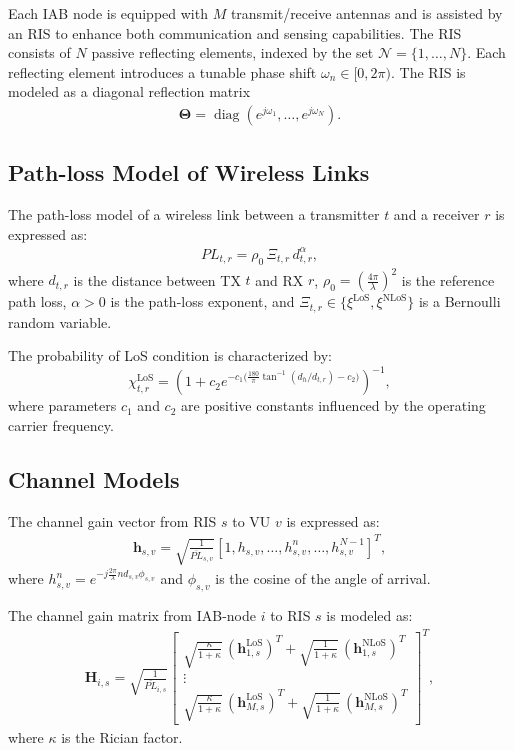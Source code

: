 \documentclass[journal]{IEEEtran}
\begin{document}
Each IAB node is equipped with $M$ transmit/receive antennas and is assisted by an RIS to enhance both communication and sensing capabilities. The RIS consists of $N$ passive reflecting elements, indexed by the set $\mathcal{N} = \{1, \ldots, N\}$. Each reflecting element introduces a tunable phase shift $\omega_n \in [0, 2\pi)$. The RIS is modeled as a diagonal reflection matrix
\begin{align}
\boldsymbol{\Theta} = \operatorname{diag}(e^{j\omega_1}, \ldots, e^{j\omega_{N}}).
\end{align}

\subsection{Path-loss Model of Wireless Links}

The path-loss model of a wireless link between a transmitter $t$ and a receiver $r$ is expressed as:
\begin{align}\label{Eqn:RandPL}
PL_{t,r} = \rho_0\, \Xi_{t,r}\, d_{t,r}^{\alpha},
\end{align} 
where $d_{t,r}$ is the distance between TX $t$ and RX $r$, $\rho_0 = (\frac{4\pi}{\lambda})^2$ is the reference path loss, $\alpha>0$ is the path-loss exponent, and $\Xi_{t,r}\in\{\xi^{\text{LoS}},  \xi^{\text{NLoS}}\}$ is a Bernoulli random variable.

The probability of LoS condition is characterized by:
\begin{equation}
    \chi^{\text{LoS}}_{t,r} = \left(1 + c_2 e^{-c_1\big(\frac{180}{\pi} \tan^{-1}(d_h/d_{t,r}) - c_2 \big)}\right)^{-1},
\end{equation} 
where parameters $c_1$ and $c_2$ are positive constants influenced by the operating carrier frequency.

\subsection{Channel Models}

The channel gain vector from RIS $s$ to VU $v$ is expressed as:
\begin{align}\label{Eqn:ChaModel_sv}
\mathbf{h}_{s,v} = \sqrt{\frac{1}{\overline{PL}_{s,v}}} \left[1, h_{s,v}, \ldots, h^n_{s,v}, \ldots, h^{N-1}_{s,v} \right]^T,
\end{align}
where $h^n_{s,v} = e^{-j \frac{2\pi}{\lambda}n d_{s,v} \phi_{s,v}}$ and $\phi_{s,v}$ is the cosine of the angle of arrival.

The channel gain matrix from IAB-node $i$ to RIS $s$ is modeled as:
\begin{align}
\mathbf{H}_{i,s} = \sqrt{\frac{1}{\overline{PL}_{i,s}}} \left[\begin{array}{c}
 \sqrt{\frac{\kappa}{1+\kappa}} \, (\mathbf{h}_{1,s}^{\mathrm{LoS}})^T + \sqrt{\frac{1}{1+\kappa}} \, (\mathbf{h}_{1,s}^{\mathrm{NLoS}})^T	\\ \vdots
	\\
\sqrt{\frac{\kappa}{1+\kappa}} \, (\mathbf{h}_{M,s}^{\mathrm{LoS}})^T + \sqrt{\frac{1}{1+\kappa}} \, (\mathbf{h}_{M,s}^{\mathrm{NLoS}})^T
\end{array}\right]^T ,
\end{align}
where $\kappa$ is the Rician factor.
\end{document}
